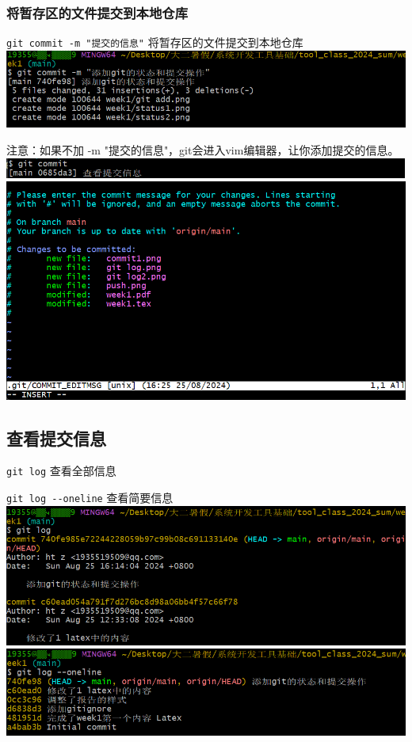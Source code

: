 \documentclass[UTF8]{ctexart}
\begin{document}
\subsubsection{将暂存区的文件提交到本地仓库}
\verb|git commit -m "提交的信息"| \quad 将暂存区的文件提交到本地仓库\\
\includegraphics[width=1\textwidth]{commit1.png}\par
注意：如果不加 -m "提交的信息"，git会进入vim编辑器，让你添加提交的信息。\\
\includegraphics[width=1\textwidth]{commit2-1.png}\\
\includegraphics[width=1\textwidth]{commit2-2.png}\par

\subsection{查看提交信息}
\verb|git log| \quad 查看全部信息\par
\verb|git log --oneline| \quad 查看简要信息\\
\includegraphics[width=1\textwidth]{git log.png}\\
\includegraphics[width=1\textwidth]{git log2.png}
\end{document}

